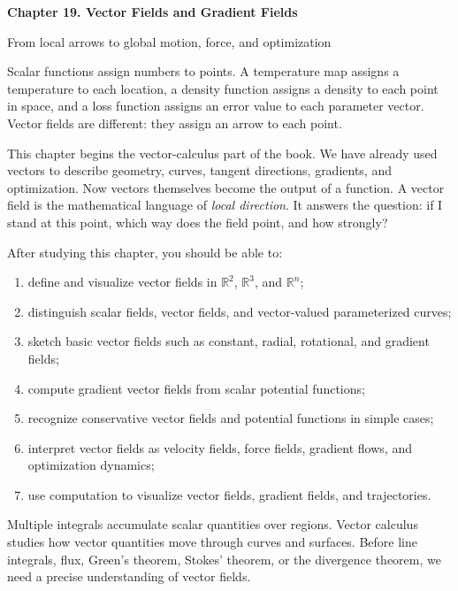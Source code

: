 \documentclass[11pt]{article}
\newcommand{\R}{\mathbb R}
\begin{document}
\begin{center}
  {\LARGE\bfseries Chapter 19. Vector Fields and Gradient Fields\par}
  \vspace{0.35em}
  {\large From local arrows to global motion, force, and optimization\par}
\end{center}

\begin{chapteroverviewbox}
Scalar functions assign numbers to points. A temperature map assigns a temperature to each location, a density function assigns a density to each point in space, and a loss function assigns an error value to each parameter vector. Vector fields are different: they assign an arrow to each point.

This chapter begins the vector-calculus part of the book. We have already used vectors to describe geometry, curves, tangent directions, gradients, and optimization. Now vectors themselves become the output of a function. A vector field is the mathematical language of \emph{local direction}. It answers the question: if I stand at this point, which way does the field point, and how strongly?
\end{chapteroverviewbox}

\begin{goalbox}
After studying this chapter, you should be able to:
\begin{enumerate}
  \item define and visualize vector fields in $\R^2$, $\R^3$, and $\R^n$;
  \item distinguish scalar fields, vector fields, and vector-valued parameterized curves;
  \item sketch basic vector fields such as constant, radial, rotational, and gradient fields;
  \item compute gradient vector fields from scalar potential functions;
  \item recognize conservative vector fields and potential functions in simple cases;
  \item interpret vector fields as velocity fields, force fields, gradient flows, and optimization dynamics;
  \item use computation to visualize vector fields, gradient fields, and trajectories.
\end{enumerate}
\end{goalbox}

\begin{notebox}
Multiple integrals accumulate scalar quantities over regions. Vector calculus studies how vector quantities move through curves and surfaces. Before line integrals, flux, Green's theorem, Stokes' theorem, or the divergence theorem, we need a precise understanding of vector fields.
\end{notebox}
\end{document}
